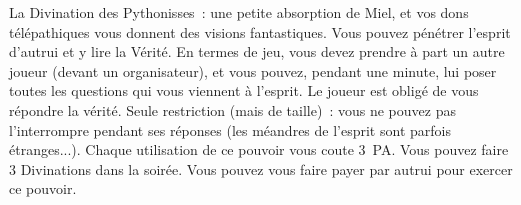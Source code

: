 \documentclass[14pt,twocolumn]{extarticle}
\begin{document}
La Divination des Pythonisses~: une petite absorption de Miel, et vos dons
télépathiques vous donnent des visions fantastiques. Vous pouvez pénétrer
l'esprit d'autrui et y lire la Vérité. En termes de jeu, vous devez prendre à
part un autre joueur (devant un organisateur), et vous pouvez, pendant une
minute, lui poser toutes les questions qui vous viennent à l'esprit. Le joueur
est obligé de vous répondre la vérité. Seule restriction (mais de taille)~:
vous ne pouvez pas l'interrompre pendant ses réponses (les méandres de l'esprit
sont parfois étranges...). Chaque utilisation de ce pouvoir vous coute 3~PA.
Vous pouvez faire 3 Divinations dans la soirée. Vous pouvez vous faire payer
par autrui pour exercer ce pouvoir.
\end{document}
